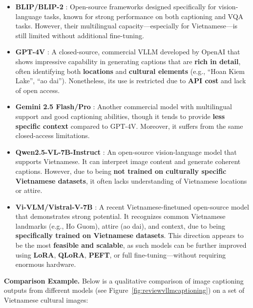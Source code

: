 \documentclass[conference]{IEEEtran}
\begin{document}
\begin{itemize}
	\item \textbf{BLIP/BLIP-2} \cite{li2023blip2}: Open-source frameworks designed specifically for vision-language tasks, known for strong performance on both captioning and VQA tasks. However, their multilingual capacity—especially for Vietnamese—is still limited without additional fine-tuning.
	
	\item \textbf{GPT-4V} \cite{openai2023gpt4}: A closed-source, commercial VLLM developed by OpenAI that shows impressive capability in generating captions that are \textbf{rich in detail}, often identifying both \textbf{locations} and \textbf{cultural elements} (e.g., “Hoan Kiem Lake”, “ao dai”). Nonetheless, its use is restricted due to \textbf{API cost} and lack of open access.
	
	\item \textbf{Gemini 2.5 Flash/Pro} \cite{google2023gemini}: Another commercial model with multilingual support and good captioning abilities, though it tends to provide \textbf{less specific context} compared to GPT-4V. Moreover, it suffers from the same closed-access limitations.
	
	\item \textbf{Qwen2.5-VL-7B-Instruct} \cite{yang2024qwen2}: An open-source vision-language model that supports Vietnamese. It can interpret image content and generate coherent captions. However, due to being \textbf{not trained on culturally specific Vietnamese datasets}, it often lacks understanding of Vietnamese locations or attire.
	
	\item \textbf{Vi-VLM/Vistral-V-7B} \cite{vistral2024vietnamese}: A recent Vietnamese-finetuned open-source model that demonstrates strong potential. It recognizes common Vietnamese landmarks (e.g., Ho Guom), attire (ao dai), and context, due to being \textbf{specifically trained on Vietnamese datasets}. This direction appears to be the most \textbf{feasible and scalable}, as such models can be further improved using \textbf{LoRA}, \textbf{QLoRA}, \textbf{PEFT}, or full fine-tuning—without requiring enormous hardware.
\end{itemize}

\textbf{Comparison Example.} Below is a qualitative comparison of image captioning outputs from different models (see Figure~\ref{fig:reviewvllmcaptioning}) on a set of Vietnamese cultural images:
\end{document}
